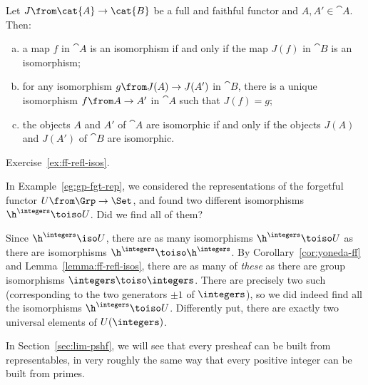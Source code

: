 \begin{lemma}   
\label{lemma:ff-refl-isos}
% 
%
%
Let $J\from \cat{A} \to \cat{B}$ be a full and faithful functor and $A, A' \in
\cat{A}$.  Then: 
% 
\begin{enumerate}[(b)]
\item 
a map $f$ in $\cat{A}$ is an isomorphism if and only if the map $J(f)$ in
$\cat{B}$ is an isomorphism;

\item 
\label{lemma:ff-refl-isos:medium} 
for any isomorphism $g\from J(A) \to J(A')$ in $\cat{B}$, there is a unique
isomorphism $f\from A \to A'$ in $\cat{A}$ such that $J(f) = g$;

\item   
\label{lemma:ff-refl-isos:weakest} 
the objects $A$ and $A'$ of $\cat{A}$ are isomorphic if and only if the
objects $J(A)$ and $J(A')$ of $\cat{B}$ are isomorphic.
\end{enumerate}
\end{lemma}

\begin{pf}
Exercise~\ref{ex:ff-refl-isos}.
\end{pf}

\begin{example}
In Example~\ref{eg:gp-fgt-rep}, we considered the representations of the
forgetful functor $U\from \Grp \to \Set$,%
%
%
and found two different isomorphisms\linebreak $\h^{\integers} \toiso U$.%
%
%
Did we find all of them?

Since $\h^{\integers} \iso U$, there are as many isomorphisms $\h^\integers
\toiso U$ as there are isomorphisms $\h^\integers \toiso \h^\integers$.  By
Corollary~\ref{cor:yoneda-ff} and
Lemma~\ref{lemma:ff-refl-isos}, there are
as many of \emph{these} as there are group isomorphisms $\integers \toiso
\integers$.  There are precisely two such (corresponding to the two
generators $\pm 1$ of $\integers$), so we did indeed find all the
isomorphisms $\h^\integers \toiso U$.  Differently put, there are exactly
two universal elements of $U(\integers)$.
\end{example}

In Section~\ref{sec:lim-pshf}, we will see that every presheaf can be built
from representables, in very roughly the same way that every positive
integer can be built from primes.%
%
%


